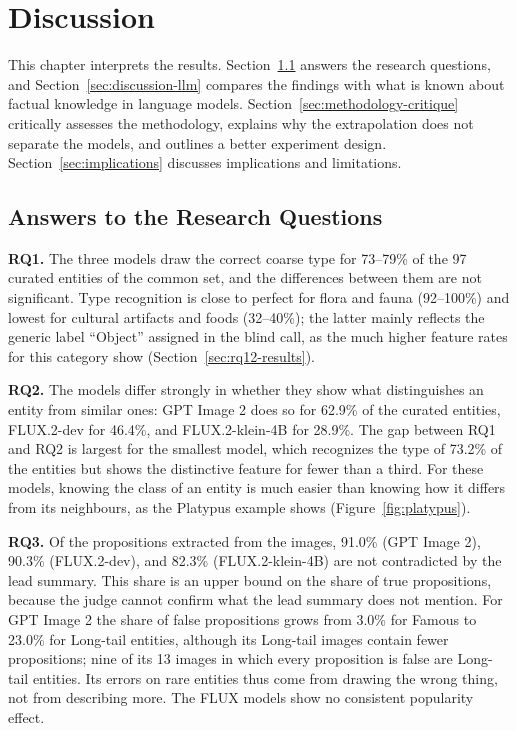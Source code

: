 \clearpage
\chapter{Discussion}

This chapter interprets the results. Section~\ref{sec:answers} answers the
research questions, and Section~\ref{sec:discussion-llm} compares the findings
with what is known about factual knowledge in language models.
Section~\ref{sec:methodology-critique} critically assesses the methodology,
explains why the extrapolation does not separate the models, and outlines a
better experiment design. Section~\ref{sec:implications} discusses
implications and limitations.

\section{Answers to the Research Questions}
\label{sec:answers}

\textbf{RQ1.} The three models draw the correct coarse type for 73--79\% of
the 97 curated entities of the common set, and the differences between them
are not significant. Type recognition is close to perfect for flora and fauna
(92--100\%) and lowest for cultural artifacts and foods (32--40\%); the latter
mainly reflects the generic label ``Object'' assigned in the blind call,
as the much higher feature rates for this category show
(Section~\ref{sec:rq12-results}).

\textbf{RQ2.} The models differ strongly in whether they show what
distinguishes an entity from similar ones: GPT Image 2 does so for 62.9\% of
the curated entities, FLUX.2-dev for 46.4\%, and FLUX.2-klein-4B for 28.9\%.
The gap between RQ1 and RQ2 is largest for the smallest model, which
recognizes the type of 73.2\% of the entities but shows the distinctive
feature for fewer than a third. For these models, knowing the class of an
entity is much easier than knowing how it differs from its neighbours, as the
Platypus example shows (Figure~\ref{fig:platypus}).

\textbf{RQ3.} Of the propositions extracted from the images, 91.0\% (GPT
Image 2), 90.3\% (FLUX.2-dev), and 82.3\% (FLUX.2-klein-4B) are not
contradicted by the lead summary. This share is an upper bound on the share of
true propositions, because the judge cannot confirm what the lead summary does
not mention. For GPT Image 2 the share of false propositions grows from 3.0\%
for Famous to 23.0\% for Long-tail entities, although its Long-tail images
contain fewer propositions; nine of its 13 images in which every proposition is
false are Long-tail entities. Its errors on rare entities thus come from
drawing the wrong thing, not from describing more. The FLUX models show no
consistent popularity effect.

